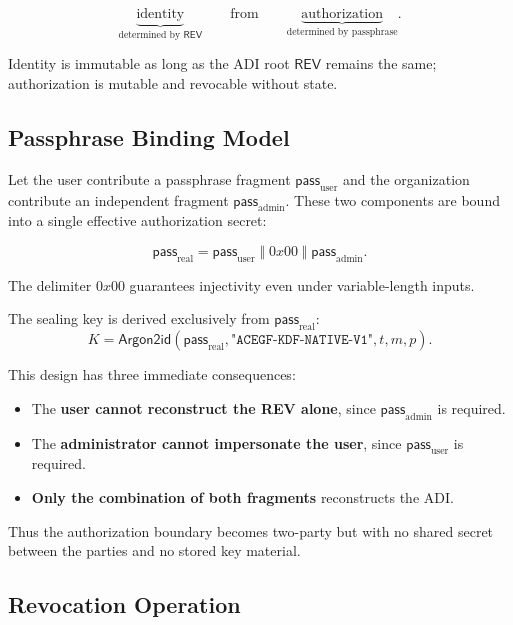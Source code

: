 \documentclass[12pt,a4paper]{article}
\begin{document}
  \[
   \underbrace{\text{identity}}_{\text{determined by }\mathsf{REV}}
   \qquad\text{from}\qquad
   \underbrace{\text{authorization}}_{\text{determined by passphrase}}.
  \]

  Identity is immutable as long as the ADI root $\mathsf{REV}$ remains the same;
  authorization is mutable and revocable without state.

  \subsection{Passphrase Binding Model}

  Let the user contribute a passphrase fragment
  $\mathsf{pass}_{\mathrm{user}}$ and the organization contribute an independent
  fragment $\mathsf{pass}_{\mathrm{admin}}$.
  These two components are bound into a single effective authorization secret:

  \[
   \mathsf{pass}_{\mathrm{real}}
   = \mathsf{pass}_{\mathrm{user}}
   \;\Vert\; 0x00 \;\Vert\;
   \mathsf{pass}_{\mathrm{admin}}.
  \]

  The delimiter $0x00$ guarantees injectivity even under variable-length inputs.

  The sealing key is derived exclusively from $\mathsf{pass}_{\mathrm{real}}$:
  \[
   K = \mathsf{Argon2id}(
   \mathsf{pass}_{\mathrm{real}},
   \texttt{"ACEGF-KDF-NATIVE-V1"},
   t, m, p
   ).
  \]

  This design has three immediate consequences:

  \begin{itemize}
   \item The \textbf{user cannot reconstruct the REV alone}, since
   $\mathsf{pass}_{\mathrm{admin}}$ is required.

   \item The \textbf{administrator cannot impersonate the user}, since
   $\mathsf{pass}_{\mathrm{user}}$ is required.

   \item \textbf{Only the combination of both fragments} reconstructs the ADI.
  \end{itemize}

  Thus the authorization boundary becomes two-party but with no shared secret
  between the parties and no stored key material.

  \subsection{Revocation Operation}
\end{document}
